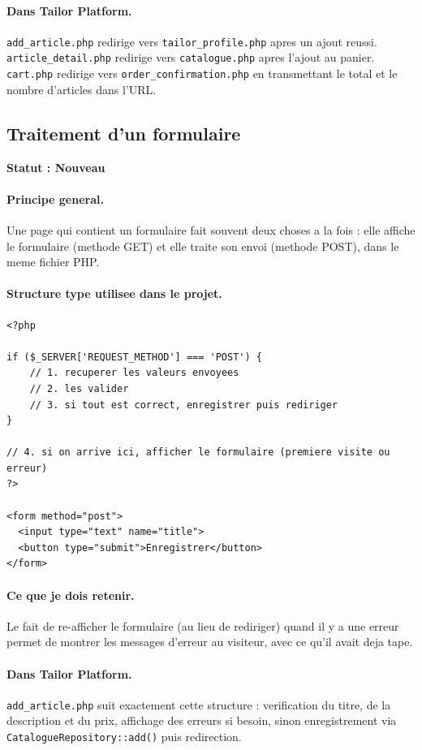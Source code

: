\documentclass[11pt,a4paper]{article}
\newcommand{\statut}[1]{\textbf{Statut : #1}}
\begin{document}
\paragraph{Dans Tailor Platform.}
\verb|add_article.php| redirige vers \verb|tailor_profile.php| apres un
ajout reussi. \verb|article_detail.php| redirige vers \verb|catalogue.php|
apres l'ajout au panier. \verb|cart.php| redirige vers
\verb|order_confirmation.php| en transmettant le total et le nombre
d'articles dans l'URL.

\subsection{Traitement d'un formulaire}

\statut{Nouveau}

\paragraph{Principe general.}
Une page qui contient un formulaire fait souvent deux choses a la fois :
elle affiche le formulaire (methode GET) et elle traite son envoi (methode
POST), dans le meme fichier PHP.

\paragraph{Structure type utilisee dans le projet.}

\begin{lstlisting}
<?php

if ($_SERVER['REQUEST_METHOD'] === 'POST') {
    // 1. recuperer les valeurs envoyees
    // 2. les valider
    // 3. si tout est correct, enregistrer puis rediriger
}

// 4. si on arrive ici, afficher le formulaire (premiere visite ou erreur)
?>

<form method="post">
  <input type="text" name="title">
  <button type="submit">Enregistrer</button>
</form>
\end{lstlisting}

\paragraph{Ce que je dois retenir.}
Le fait de re-afficher le formulaire (au lieu de rediriger) quand il y a une
erreur permet de montrer les messages d'erreur au visiteur, avec ce qu'il
avait deja tape.

\paragraph{Dans Tailor Platform.}
\verb|add_article.php| suit exactement cette structure : verification du
titre, de la description et du prix, affichage des erreurs si besoin, sinon
enregistrement via \verb|CatalogueRepository::add()| puis redirection.
\end{document}
